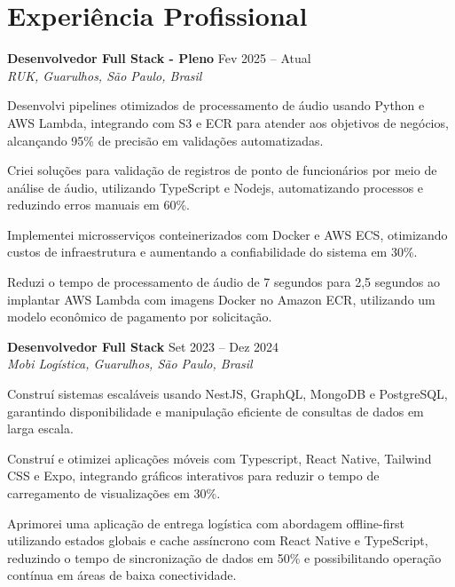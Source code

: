 \documentclass[11pt,letterpaper]{article}
\begin{document}
\section{Experiência Profissional}

\textbf{Desenvolvedor Full Stack - Pleno} \hfill Fev 2025 – Atual \\
\textit{RUK, Guarulhos, São Paulo, Brasil}
\begin{achievements}
    \item Desenvolvi pipelines otimizados de processamento de áudio usando Python e AWS Lambda, integrando com S3 e ECR para atender aos objetivos de negócios, alcançando 95\% de precisão em validações automatizadas.
    \item Criei soluções para validação de registros de ponto de funcionários por meio de análise de áudio, utilizando TypeScript e Nodejs, automatizando processos e reduzindo erros manuais em 60\%.
    \item Implementei microsserviços conteinerizados com Docker e AWS ECS, otimizando custos de infraestrutura e aumentando a confiabilidade do sistema em 30\%.
    \item Reduzi o tempo de processamento de áudio de 7 segundos para 2,5 segundos ao implantar AWS Lambda com imagens Docker no Amazon ECR, utilizando um modelo econômico de pagamento por solicitação.
\end{achievements}

\textbf{Desenvolvedor Full Stack} \hfill Set 2023 – Dez 2024 \\
\textit{Mobi Logística, Guarulhos, São Paulo, Brasil}
\begin{achievements}
    \item Construí sistemas escaláveis usando NestJS, GraphQL, MongoDB e PostgreSQL, garantindo disponibilidade e manipulação eficiente de consultas de dados em larga escala.
    \item Construí e otimizei aplicações móveis com Typescript, React Native, Tailwind CSS e Expo, integrando gráficos interativos para reduzir o tempo de carregamento de visualizações em 30\%.
    \item Aprimorei uma aplicação de entrega logística com abordagem offline-first utilizando estados globais e cache assíncrono com React Native e TypeScript, reduzindo o tempo de sincronização de dados em 50\% e possibilitando operação contínua em áreas de baixa conectividade.
\end{achievements}
\end{document}
